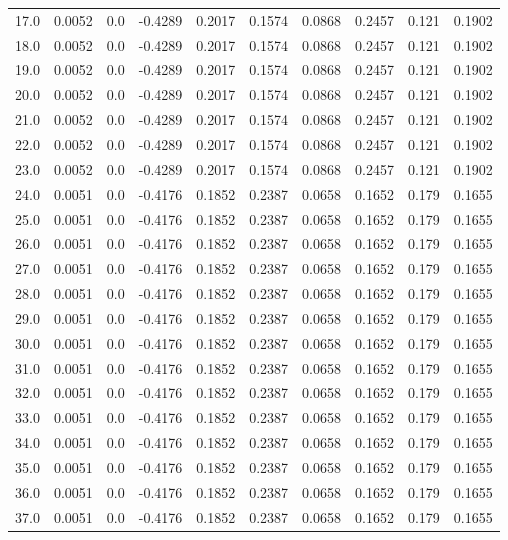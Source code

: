 \begin{longtable}{lrrrrrrrrr}
17.0 & 0.0052 & 0.0 & -0.4289 & 0.2017 & 0.1574 & 0.0868 & 0.2457 & 0.121 & 0.1902 \\
18.0 & 0.0052 & 0.0 & -0.4289 & 0.2017 & 0.1574 & 0.0868 & 0.2457 & 0.121 & 0.1902 \\
19.0 & 0.0052 & 0.0 & -0.4289 & 0.2017 & 0.1574 & 0.0868 & 0.2457 & 0.121 & 0.1902 \\
20.0 & 0.0052 & 0.0 & -0.4289 & 0.2017 & 0.1574 & 0.0868 & 0.2457 & 0.121 & 0.1902 \\
21.0 & 0.0052 & 0.0 & -0.4289 & 0.2017 & 0.1574 & 0.0868 & 0.2457 & 0.121 & 0.1902 \\
22.0 & 0.0052 & 0.0 & -0.4289 & 0.2017 & 0.1574 & 0.0868 & 0.2457 & 0.121 & 0.1902 \\
23.0 & 0.0052 & 0.0 & -0.4289 & 0.2017 & 0.1574 & 0.0868 & 0.2457 & 0.121 & 0.1902 \\
24.0 & 0.0051 & 0.0 & -0.4176 & 0.1852 & 0.2387 & 0.0658 & 0.1652 & 0.179 & 0.1655 \\
25.0 & 0.0051 & 0.0 & -0.4176 & 0.1852 & 0.2387 & 0.0658 & 0.1652 & 0.179 & 0.1655 \\
26.0 & 0.0051 & 0.0 & -0.4176 & 0.1852 & 0.2387 & 0.0658 & 0.1652 & 0.179 & 0.1655 \\
27.0 & 0.0051 & 0.0 & -0.4176 & 0.1852 & 0.2387 & 0.0658 & 0.1652 & 0.179 & 0.1655 \\
28.0 & 0.0051 & 0.0 & -0.4176 & 0.1852 & 0.2387 & 0.0658 & 0.1652 & 0.179 & 0.1655 \\
29.0 & 0.0051 & 0.0 & -0.4176 & 0.1852 & 0.2387 & 0.0658 & 0.1652 & 0.179 & 0.1655 \\
30.0 & 0.0051 & 0.0 & -0.4176 & 0.1852 & 0.2387 & 0.0658 & 0.1652 & 0.179 & 0.1655 \\
31.0 & 0.0051 & 0.0 & -0.4176 & 0.1852 & 0.2387 & 0.0658 & 0.1652 & 0.179 & 0.1655 \\
32.0 & 0.0051 & 0.0 & -0.4176 & 0.1852 & 0.2387 & 0.0658 & 0.1652 & 0.179 & 0.1655 \\
33.0 & 0.0051 & 0.0 & -0.4176 & 0.1852 & 0.2387 & 0.0658 & 0.1652 & 0.179 & 0.1655 \\
34.0 & 0.0051 & 0.0 & -0.4176 & 0.1852 & 0.2387 & 0.0658 & 0.1652 & 0.179 & 0.1655 \\
35.0 & 0.0051 & 0.0 & -0.4176 & 0.1852 & 0.2387 & 0.0658 & 0.1652 & 0.179 & 0.1655 \\
36.0 & 0.0051 & 0.0 & -0.4176 & 0.1852 & 0.2387 & 0.0658 & 0.1652 & 0.179 & 0.1655 \\
37.0 & 0.0051 & 0.0 & -0.4176 & 0.1852 & 0.2387 & 0.0658 & 0.1652 & 0.179 & 0.1655 \\

\end{longtable}
